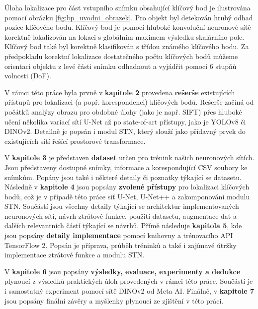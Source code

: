 Úloha lokalizace pro část vstupního snímku obsahující klíčový bod je ilustrována pomocí obrázku \ref{fig:bp_uvodni_obrazek}. Pro objekt byl detekován hrubý odhad pozice klíčového bodu. Klíčový bod je pomocí hluboké konvoluční neuronové sítě korektně lokalizován na lokaci s globálním maximem výsledku skalárního pole. Klíčový bod také byl korektně klasifikován s třídou známého klíčového bodu. Za předpokladu korektní lokalizace dostatečného počtu klíčových bodů můžeme orientaci objektu z levé části snímku odhadnout a vyjádřit pomocí 6 stupňů volnosti (DoF).

V rámci této práce byla prvně v \textbf{kapitole 2}  provedena \textbf{rešerše} existujících přístupů pro lokalizaci (a popř. korespondenci) klíčových bodů. Rešerše začíná od počátků analýzy obrazu pro obdobné úlohy (jako je např. SIFT) přes hluboké učení několika variací sítí U-Net až po state-of-art přístupy, jako je YOLOv8 či DINOv2. Detailně je popsán i modul STN, který slouží jako přídavný prvek do existujících sítí řešící prostorové transformace.

V \textbf{kapitole 3} je představen \textbf{dataset} určen pro trénink našich neuronových sítích. Jsou představeny dostupné snímky, informace a korespondující CSV soubory ke snímkům. Popány jsou také i některé detaily či poznatky týkající se datasetu. Následně v \textbf{kapitole 4} jsou popsány \textbf{zvolené přístupy} pro lokalizaci klíčových bodů, což je v případě této práce síť U-Net, U-Net++ a zakomponování modulu STN. Součástí jsou všechny detaily týkající se architektur implementovaných neuronových sítí, návrh ztrátové funkce, použití datasetu, augmentace dat a dalších relevantních částí týkající se návrhů. Přímě následuje \textbf{kapitola 5}, kde jsou popsány \textbf{detaily implementace} pomocí knihovny a trénovacího API TensorFlow 2. Popsán je příprava, průběh tréninků a také i zajímavé útržky implementace ztrátové funkce a modulu STN.

V \textbf{kapitole 6} jsou popsány \textbf{výsledky, evaluace, experimenty a dedukce} plynoucí z výsledků praktických úloh provedených v rámci této práce. Součástí je i samostatný experiment pomocí sítě DINOv2 od Meta AI. Finálně, v \textbf{kapitole 7} jsou popsány finální závěry a myšlenky plynoucí ze zjištění v této práci.
\endinput